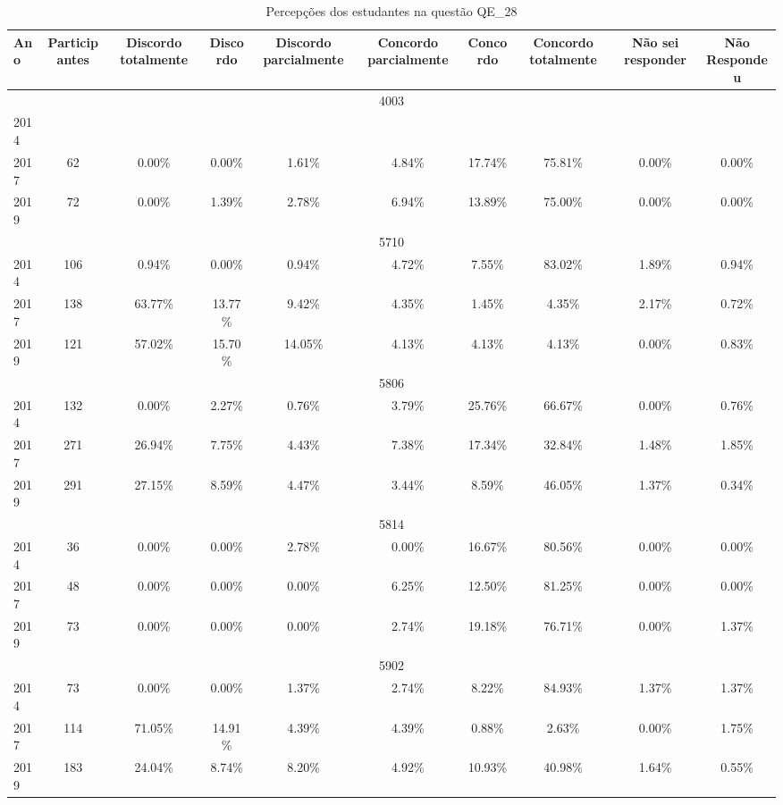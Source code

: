 \begin{table}[H]
\centering
\caption{Percepções dos estudantes na questão QE\_28}
\begin{tabular}{|l|c|ccc|ccc|cc|}
\hline
\toprule
Ano & Participantes & Discordo totalmente & Discordo & Discordo parcialmente & Concordo parcialmente & Concordo & Concordo totalmente & Não sei responder & Não Respondeu \\
\midrule
\hline
\multicolumn{10}{|c|}{4003}\\
\hline
2014 & & & & & & & & & \\
2017 & 62 & 0.00\% & 0.00\% & 1.61\% & 4.84\% & 17.74\% & 75.81\% & 0.00\% & 0.00\%\\
2019 & 72 & 0.00\% & 1.39\% & 2.78\% & 6.94\% & 13.89\% & 75.00\% & 0.00\% & 0.00\%\\
\hline
\hline
\multicolumn{10}{|c|}{5710}\\
\hline
2014 & 106 & 0.94\% & 0.00\% & 0.94\% & 4.72\% & 7.55\% & 83.02\% & 1.89\% & 0.94\%\\
2017 & 138 & 63.77\% & 13.77\% & 9.42\% & 4.35\% & 1.45\% & 4.35\% & 2.17\% & 0.72\%\\
2019 & 121 & 57.02\% & 15.70\% & 14.05\% & 4.13\% & 4.13\% & 4.13\% & 0.00\% & 0.83\%\\
\hline
\hline
\multicolumn{10}{|c|}{5806}\\
\hline
2014 & 132 & 0.00\% & 2.27\% & 0.76\% & 3.79\% & 25.76\% & 66.67\% & 0.00\% & 0.76\%\\
2017 & 271 & 26.94\% & 7.75\% & 4.43\% & 7.38\% & 17.34\% & 32.84\% & 1.48\% & 1.85\%\\
2019 & 291 & 27.15\% & 8.59\% & 4.47\% & 3.44\% & 8.59\% & 46.05\% & 1.37\% & 0.34\%\\
\hline
\hline
\multicolumn{10}{|c|}{5814}\\
\hline
2014 & 36 & 0.00\% & 0.00\% & 2.78\% & 0.00\% & 16.67\% & 80.56\% & 0.00\% & 0.00\%\\
2017 & 48 & 0.00\% & 0.00\% & 0.00\% & 6.25\% & 12.50\% & 81.25\% & 0.00\% & 0.00\%\\
2019 & 73 & 0.00\% & 0.00\% & 0.00\% & 2.74\% & 19.18\% & 76.71\% & 0.00\% & 1.37\%\\
\hline
\hline
\multicolumn{10}{|c|}{5902}\\
\hline
2014 & 73 & 0.00\% & 0.00\% & 1.37\% & 2.74\% & 8.22\% & 84.93\% & 1.37\% & 1.37\%\\
2017 & 114 & 71.05\% & 14.91\% & 4.39\% & 4.39\% & 0.88\% & 2.63\% & 0.00\% & 1.75\%\\
2019 & 183 & 24.04\% & 8.74\% & 8.20\% & 4.92\% & 10.93\% & 40.98\% & 1.64\% & 0.55\%\\

\end{tabular}
\end{table}

